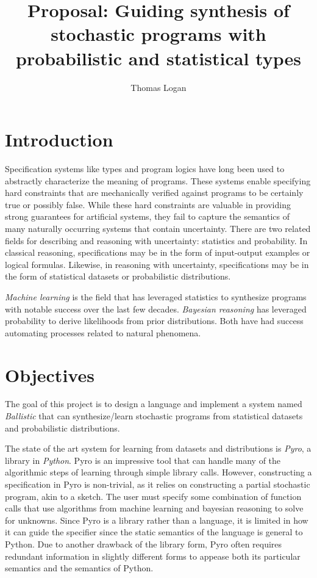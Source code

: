 \documentclass[runningheads]{llncs}
\title{Proposal: Guiding synthesis of stochastic programs with probabilistic and statistical types}
\author{Thomas Logan}
\institute{University of Texas at Austin}
\begin{document}
\maketitle

\section{Introduction}
Specification systems like types and program logics have long been used to abstractly characterize the meaning of programs.
These systems enable specifying hard constraints that are mechanically verified against programs to be certainly true or possibly false.
While these hard constraints are valuable in providing strong guarantees for artificial systems, 
they fail to capture the semantics of many naturally occurring systems that contain uncertainty.
There are two related fields for describing and reasoning with uncertainty: statistics and probability.
In classical reasoning, specifications may be in the form of input-output examples or logical formulas.   
Likewise, in reasoning with uncertainty, specifications may be in the form of statistical datasets or probabilistic distributions.


\emph{Machine learning} is the field that has leveraged statistics to synthesize programs 
with notable success over the last few decades.
\emph{Bayesian reasoning} has leveraged probability to derive likelihoods from prior distributions.
Both have had success automating processes related to natural phenomena.  


\section{Objectives}
The goal of this project is to design a language and implement a system named \emph{Ballistic} 
that can synthesize/learn stochastic programs from statistical datasets and probabilistic distributions.

The state of the art system for learning from datasets and distributions is \emph{Pyro}, a library in \emph{Python}. 
Pyro is an impressive tool that can handle many of the algorithmic steps of learning through simple library calls. 
However, constructing a specification in Pyro is non-trivial, as it relies on constructing 
a partial stochastic program, akin to a sketch. The user must specify some combination of function calls that use 
algorithms from machine learning and bayesian reasoning to solve for unknowns. 
Since Pyro is a library rather than a language, it is limited in how it can guide the specifier 
since the static semantics of the language is general to Python. 
Due to another drawback of the library form, Pyro often requires redundant information 
in slightly different forms to appease both its particular semantics and the semantics of Python. 
\end{document}
